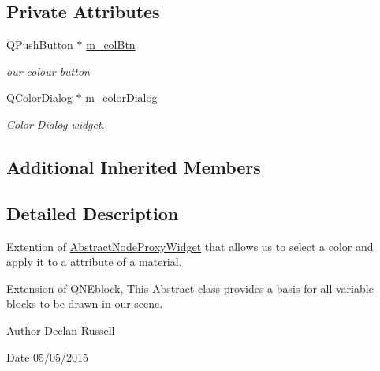 \subsection*{Private Attributes}
\begin{DoxyCompactItemize}
\item 
\hypertarget{class_color_node_proxy_widget_a68395843f6fcae8ef7995388a309930c}{Q\-Push\-Button $\ast$ \hyperlink{class_color_node_proxy_widget_a68395843f6fcae8ef7995388a309930c}{m\-\_\-col\-Btn}}\label{class_color_node_proxy_widget_a68395843f6fcae8ef7995388a309930c}

\begin{DoxyCompactList}\small\item\em our colour button \end{DoxyCompactList}\item 
\hypertarget{class_color_node_proxy_widget_a6bdf3c7038a0e52fc1f293fcb04dd28c}{Q\-Color\-Dialog $\ast$ \hyperlink{class_color_node_proxy_widget_a6bdf3c7038a0e52fc1f293fcb04dd28c}{m\-\_\-color\-Dialog}}\label{class_color_node_proxy_widget_a6bdf3c7038a0e52fc1f293fcb04dd28c}

\begin{DoxyCompactList}\small\item\em Color Dialog widget. \end{DoxyCompactList}\end{DoxyCompactItemize}
\subsection*{Additional Inherited Members}


\subsection{Detailed Description}
Extention of \hyperlink{class_abstract_node_proxy_widget}{Abstract\-Node\-Proxy\-Widget} that allows us to select a color and apply it to a attribute of a material. 

Extension of Q\-N\-Eblock, This Abstract class provides a basis for all variable blocks to be drawn in our scene.

\begin{DoxyAuthor}{Author}
Declan Russell 
\end{DoxyAuthor}
\begin{DoxyDate}{Date}
05/05/2015 
\end{DoxyDate}


